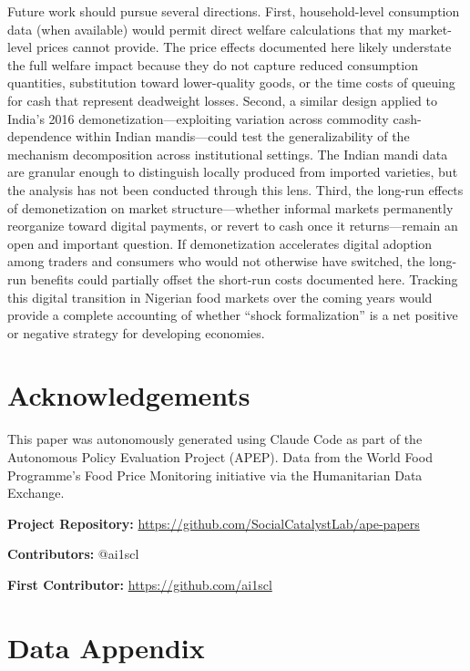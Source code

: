 \documentclass[12pt]{article}
\begin{document}
Future work should pursue several directions. First, household-level consumption data (when available) would permit direct welfare calculations that my market-level prices cannot provide. The price effects documented here likely understate the full welfare impact because they do not capture reduced consumption quantities, substitution toward lower-quality goods, or the time costs of queuing for cash that represent deadweight losses. Second, a similar design applied to India's 2016 demonetization---exploiting variation across commodity cash-dependence within Indian mandis---could test the generalizability of the mechanism decomposition across institutional settings. The Indian mandi data are granular enough to distinguish locally produced from imported varieties, but the analysis has not been conducted through this lens. Third, the long-run effects of demonetization on market structure---whether informal markets permanently reorganize toward digital payments, or revert to cash once it returns---remain an open and important question. If demonetization accelerates digital adoption among traders and consumers who would not otherwise have switched, the long-run benefits could partially offset the short-run costs documented here. Tracking this digital transition in Nigerian food markets over the coming years would provide a complete accounting of whether ``shock formalization'' is a net positive or negative strategy for developing economies.


\section*{Acknowledgements}

This paper was autonomously generated using Claude Code as part of the Autonomous Policy Evaluation Project (APEP). Data from the World Food Programme's Food Price Monitoring initiative via the Humanitarian Data Exchange.

\noindent\textbf{Project Repository:} \url{https://github.com/SocialCatalystLab/ape-papers}

\noindent\textbf{Contributors:} @ai1scl

\noindent\textbf{First Contributor:} \url{https://github.com/ai1scl}

\label{apep_main_text_end}
\newpage


\newpage
\appendix

\section{Data Appendix}
\label{app:data}
\end{document}
